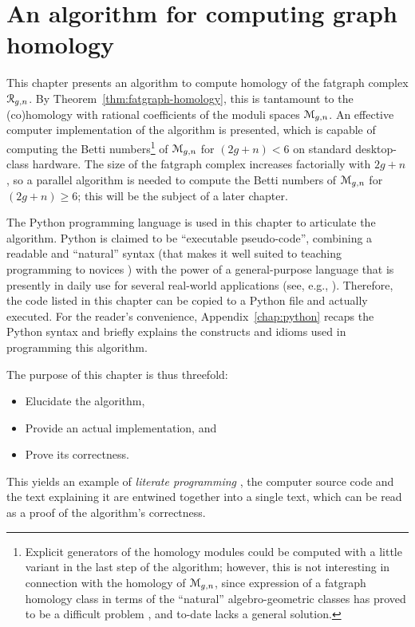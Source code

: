 
\chapter[An algorithm for graph homology]
  {An algorithm for computing graph homology}
\label{chap:algorithm}

This chapter presents an algorithm to compute homology of the fatgraph
complex $\mathcal{R}_{g,n}$.  By Theorem~\ref{thm:fatgraph-homology}, this is
tantamount to the (co)homology with rational coefficients of the
moduli spaces $\mathcal{M}_{g,n}$. An effective computer implementation of the
algorithm is presented, which is capable of computing the Betti
numbers\footnote{Explicit generators of the homology modules could be
  computed with a little variant in the last step of the algorithm;
  however, this is not interesting in connection with the homology of
  $\mathcal{M}_{g,n}$, since expression of a fatgraph homology class in terms
  of the ``natural'' algebro-geometric classes has proved to be a
  difficult problem \cite{mondello:2004,
    igusa:combinatorial-miller-morita-mumford-classes-and-witten-cycles,
    igusa:graph-cohomology-and-kontsevich-cycles}, and to-date lacks a
  general solution.} of $\mathcal{M}_{g,n}$ for $(2g+n) < 6$ on standard
desktop-class hardware.  The size of the fatgraph complex increases
factorially with $2g+n$, so a parallel algorithm is needed to compute
the Betti numbers of $\mathcal{M}_{g,n}$ for $(2g+n) \geq 6$; this will be the
subject of a later chapter.

The Python programming language is used in this chapter to articulate
the algorithm.  Python is claimed to be ``executable pseudo-code'',
combining a readable and ``natural'' syntax (that makes it well suited
to teaching programming to novices \cite{georgatos:python}) with the
power of a general-purpose language that is presently in daily use for
several real-world applications (see, e.g., \cite{python:success}).
Therefore, the code listed in this chapter can be copied to a Python
file and actually executed.  For the reader's convenience,
Appendix~\ref{chap:python} recaps the Python syntax and briefly explains the
constructs and idioms used in programming this algorithm.

The purpose of this chapter is thus threefold:
\begin{itemize}
\item Elucidate the algorithm,
\item Provide an actual implementation, and
\item Prove its correctness.
\end{itemize}
This yields an example of \emph{literate programming} \cite{knuth:lp},
the computer source code and the text explaining it are entwined
together into a single text, which can be read as a proof of the
algorithm's correctness.

